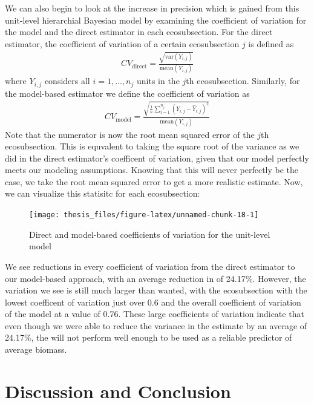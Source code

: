 \documentclass[12pt,twoside]{reedthesis}
\begin{document}
We can also begin to look at the increase in precision which is gained from this unit-level hierarchial Bayesian model by examining the coefficient of variation for the model and the direct estimator in each ecosubsection. For the direct estimator, the coefficient of variation of a certain ecosubsection \(j\) is defined as
\begin{align}
CV_{\text{direct}} = \frac{\sqrt{\text{var}(Y_{i,j})}}{\text{mean}(Y_{i,j})}
\end{align}
where \(Y_{i,j}\) considers all \(i = 1,\dots,n_j\) units in the \(j\)th ecosubsection. Similarly, for the model-based estimator we define the coefficient of variation as
\begin{align}
CV_{\text{model}} = \frac{\sqrt{\frac{1}{n}\sum_{i=1}^{n_j} (Y_{i,j} - \hat{Y}_{i,j})^2}}{\text{mean}(Y_{i,j})}
\end{align}
Note that the numerator is now the root mean squared error of the \(j\)th ecosubsection. This is equvalent to taking the square root of the variance as we did in the direct estimator's coefficent of variation, given that our model perfectly meets our modeling assumptions. Knowing that this will never perfectly be the case, we take the root mean squared error to get a more realistic estimate. Now, we can visualize this statisitc for each ecosubsection:
\begin{figure}

{\centering \texttt{[image: thesis\_files/figure-latex/unnamed-chunk-18-1]} 

}

\caption{Direct and model-based coefficients of variation for the unit-level model}\label{fig:unnamed-chunk-18}
\end{figure}
We see reductions in every coefficient of variation from the direct estimator to our model-based approach, with an average reduction in of 24.17\%. However, the variation we see is still much larger than wanted, with the ecosubsection with the lowest coefficent of variation just over 0.6 and the overall coefficient of variation of the model at a value of 0.76. These large coefficients of variation indicate that even though we were able to reduce the variance in the estimate by an average of 24.17\%, the will not perform well enough to be used as a reliable predictor of average biomass.

\hypertarget{discussion-and-conclusion}{%
\chapter{Discussion and Conclusion}\label{discussion-and-conclusion}}
\end{document}
